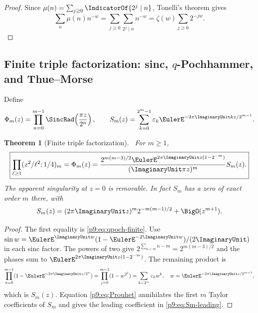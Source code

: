 \documentclass[11pt]{article}
\numberwithin{equation}{section}
\newtheorem{theorem}{Theorem}[section]
\theoremstyle{definition}
\theoremstyle{remark}
\begin{document}
\begin{proof}
Since $\mu(n)=\sum_{j\ge0}\IndicatorOf{2^j\mid n}$, Tonelli's theorem gives
\[
 \sum_n\mu(n)n^{-w}=\sum_{j\ge0}\sum_{2^j\mid n}n^{-w}
 =\zeta(w)\sum_{j\ge0}2^{-jw}.
\]
\end{proof}

\subsection{Finite triple factorization: sinc, $q$-Pochhammer, and Thue--Morse}
Define
\begin{equation}
 \Phi_m(z)=\prod_{n=0}^{m-1}\SincRad\!\left(\frac{\pi z}{2^n}\right),
 \qquad
 S_m(z)=\sum_{k=0}^{2^m-1}\varepsilon_k
 \EulerE^{-2\pi\ImaginaryUnit kz/2^{m-1}}.                                \label{p9:eq:Phi-m-Sm}
\end{equation}

\begin{theorem}[Finite triple factorization]\label{p9:thm:triple-factor}
\statusN\ For $m\ge1$,
\begin{equation}
 \boxed{
 \prod_{\ell\ge1}(z^2/\ell^2;1/4)_m
 =\Phi_m(z)
 =\frac{2^{m(m-3)/2}\EulerE^{2\pi\ImaginaryUnit z(1-2^{-m})}}{(\ImaginaryUnit\pi z)^m}
 S_m(z).}                                                   \label{p9:eq:triple-factor}
\end{equation}
The apparent singularity at $z=0$ is removable.  In fact $S_m$ has a zero of exact order
$m$ there, with
\begin{equation}
 S_m(z)=(2\pi\ImaginaryUnit z)^m2^{-m(m-1)/2}+\BigO(z^{m+1}).         \label{p9:eq:Sm-leading}
\end{equation}
\end{theorem}

\begin{proof}
The first equality is \eqref{p9:eq:qpoch-finite}.  Use
$\sin w=\EulerE^{\ImaginaryUnit w}(1-\EulerE^{-2\ImaginaryUnit w})/(2\ImaginaryUnit)$ in each sinc factor.  The powers of two give
$2^{\sum_{n<m}n-m}=2^{m(m-3)/2}$ and the phases sum to
$\EulerE^{2\pi\ImaginaryUnit z(1-2^{-m})}$.  The remaining product is
\[
 \prod_{n=0}^{m-1}(1-\EulerE^{-2\pi\ImaginaryUnit z/2^n})
 =\prod_{j=0}^{m-1}(1-w^{2^j})=\sum_{k<2^m}\varepsilon_kw^k,
 \quad w=\EulerE^{-2\pi\ImaginaryUnit z/2^{m-1}},
\]
which is $S_m(z)$.  Equation \eqref{p9:eq:Prouhet} annihilates the first $m$ Taylor
coefficients of $S_m$ and gives the leading coefficient in \eqref{p9:eq:Sm-leading}.
\end{proof}
\end{document}
